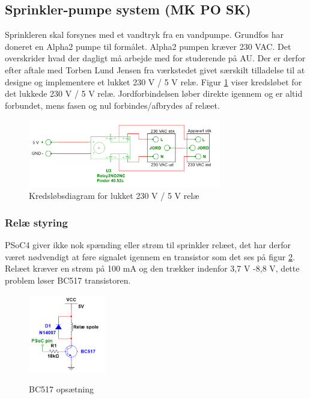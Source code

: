 
\subsection{Sprinkler-pumpe system (MK PO SK)}

Sprinkleren skal forsynes med et vandtryk fra en vandpumpe. Grundfos har doneret en Alpha2 pumpe til formålet. Alpha2 pumpen kræver 230 VAC. Det overskrider hvad der dagligt må arbejde med for studerende på AU. Der er derfor efter aftale med Torben Lund Jensen fra værkstedet givet særskilt tilladelse til at designe og implementere et lukket 230 V / 5 V relæ. Figur \ref{lab:Relay_box} viser kredsløbet for det lukkede 230 V / 5 V relæ. Jordforbindelsen løber direkte igennem og er altid forbundet, mens fasen og nul forbindes/afbrydes af relæet.  

\begin{figure}[H]
  \centering
    \includegraphics[width=0.75\textwidth]{Billeder/230VAC_KREDS}
    \caption{Kredsløbsdiagram for lukket 230 V / 5 V relæ}
    \label{lab:Relay_box}
\end{figure}

\subsubsection{Relæ styring}

PSoC4 giver ikke nok spænding eller strøm til sprinkler relæet, det har derfor været nødvendigt at føre signalet igennem en transistor som det ses på figur \ref{lab:BC517}. Relæet kræver en strøm på 100 mA og den trækker indenfor 3,7 V -8,8 V, dette problem løser BC517 transistoren. 

\begin{figure}[H] \centering
{\includegraphics[width=0.3\textwidth]{Billeder/BC517}}
\caption{BC517 opsætning}
\label{lab:BC517}
\raggedright
\end{figure} 

